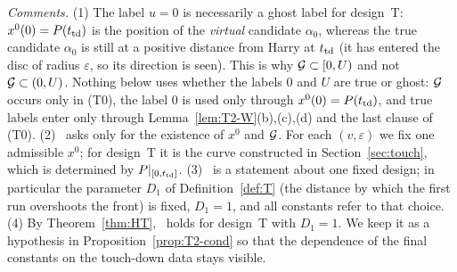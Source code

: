 \noindent\emph{Comments.} (1) The label $u=0$ is necessarily a ghost label for design~T: $x^0(0)=P(t_{\mathrm{td}})$ is the position of the
\emph{virtual} candidate $\alpha_0$, whereas the true candidate $\alpha_0$ is still at a positive distance from Harry at $t_{\mathrm{td}}$
(it has entered the disc of radius $\varepsilon$, so its direction is seen). This is why $\mathcal G\subset[0,U)$ and not
$\mathcal G\subset(0,U)$. Nothing below uses whether the labels $0$ and $U$ are true or ghost: $\mathcal G$ occurs only in (T0), the label $0$
is used only through $x^0(0)=P(t_{\mathrm{td}})$, and true labels enter only through Lemma~\ref{lem:T2-W}(b),(c),(d) and the last clause
of (T0).
(2) \MHT\ asks only for the existence of $x^0$ and $\mathcal G$. For each $(v,\varepsilon)$ we fix one admissible $x^0$; for design~T
it is the curve constructed in Section~\ref{sec:touch}, which is determined by $P|_{[0,t_{\mathrm{td}}]}$.
(3) \MHT\ is a statement about one fixed design; in particular the parameter $D_1$ of Definition~\ref{def:T} (the distance by
which the first run overshoots the front) is fixed, $D_1=1$, and all constants refer to that choice.
(4) By Theorem~\ref{thm:HT}, \MHT\ holds for design~T with $D_1=1$. We keep it as a hypothesis in Proposition~\ref{prop:T2-cond} so that the
dependence of the final constants on the touch-down data stays visible.

